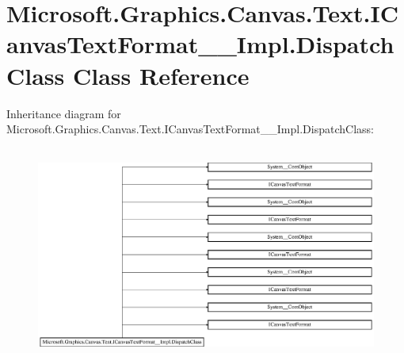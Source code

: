 \hypertarget{class_microsoft_1_1_graphics_1_1_canvas_1_1_text_1_1_i_canvas_text_format_____impl_1_1_dispatch_class}{}\section{Microsoft.\+Graphics.\+Canvas.\+Text.\+I\+Canvas\+Text\+Format\+\_\+\+\_\+\+Impl.\+Dispatch\+Class Class Reference}
\label{class_microsoft_1_1_graphics_1_1_canvas_1_1_text_1_1_i_canvas_text_format_____impl_1_1_dispatch_class}
Inheritance diagram for Microsoft.\+Graphics.\+Canvas.\+Text.\+I\+Canvas\+Text\+Format\+\_\+\+\_\+\+Impl.\+Dispatch\+Class\+:\begin{figure}[H]
\begin{center}
\leavevmode
\includegraphics[height=7.096774cm]{class_microsoft_1_1_graphics_1_1_canvas_1_1_text_1_1_i_canvas_text_format_____impl_1_1_dispatch_class}
\end{center}
\end{figure}
